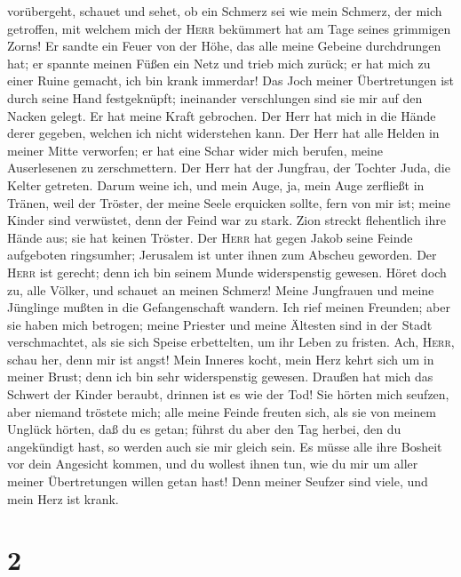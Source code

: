 vorübergeht, schauet und sehet, ob ein Schmerz sei wie mein Schmerz, der
mich getroffen, mit welchem mich der \textsc{Herr} bekümmert hat am Tage
seines grimmigen Zorns!  Er sandte ein Feuer von der
Höhe, das alle meine Gebeine durchdrungen hat; er spannte meinen Füßen
ein Netz und trieb mich zurück; er hat mich zu einer Ruine gemacht, ich
bin krank immerdar!  Das Joch meiner Übertretungen ist
durch seine Hand festgeknüpft; ineinander verschlungen sind sie mir auf
den Nacken gelegt. Er hat meine Kraft gebrochen. Der Herr hat mich in
die Hände derer gegeben, welchen ich nicht widerstehen kann.
 Der Herr hat alle Helden in meiner Mitte verworfen; er
hat eine Schar wider mich berufen, meine Auserlesenen zu zerschmettern.
Der Herr hat der Jungfrau, der Tochter Juda, die Kelter getreten.
 Darum weine ich, und mein Auge, ja, mein Auge zerfließt
in Tränen, weil der Tröster, der meine Seele erquicken sollte, fern von
mir ist; meine Kinder sind verwüstet, denn der Feind war zu stark.
 Zion streckt flehentlich ihre Hände aus; sie hat keinen
Tröster. Der \textsc{Herr} hat gegen Jakob seine Feinde aufgeboten
ringsumher; Jerusalem ist unter ihnen zum Abscheu geworden.
 Der \textsc{Herr} ist gerecht; denn ich bin seinem Munde
widerspenstig gewesen. Höret doch zu, alle Völker, und schauet an meinen
Schmerz! Meine Jungfrauen und meine Jünglinge mußten in die
Gefangenschaft wandern.  Ich rief meinen Freunden; aber
sie haben mich betrogen; meine Priester und meine Ältesten sind in der
Stadt verschmachtet, als sie sich Speise erbettelten, um ihr Leben zu
fristen.  Ach, \textsc{Herr}, schau her, denn mir ist
angst! Mein Inneres kocht, mein Herz kehrt sich um in meiner Brust; denn
ich bin sehr widerspenstig gewesen. Draußen hat mich das Schwert der
Kinder beraubt, drinnen ist es wie der Tod!  Sie hörten
mich seufzen, aber niemand tröstete mich; alle meine Feinde freuten
sich, als sie von meinem Unglück hörten, daß du es getan; führst du aber
den Tag herbei, den du angekündigt hast, so werden auch sie mir gleich
sein.  Es müsse alle ihre Bosheit vor dein Angesicht
kommen, und du wollest ihnen tun, wie du mir um aller meiner
Übertretungen willen getan hast! Denn meiner Seufzer sind viele, und
mein Herz ist krank.

\hypertarget{section-1}{%
\section{2}\label{section-1}}

